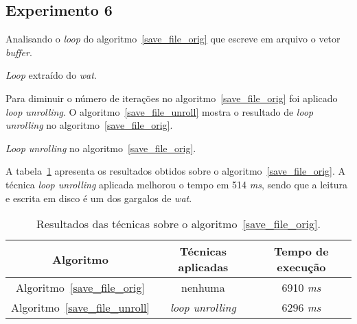 \subsection{Experimento 6}

Analisando o \textit{loop} do algoritmo~\ref{save_file_orig} que escreve em arquivo o 
vetor \textit{buffer}.

\begin{algorithm}[H]
  \caption{\textit{Loop} extraído do \textit{wat}.}
\label{save_file_orig}

\end{algorithm}

Para diminuir o número de iterações no algoritmo~\ref{save_file_orig} foi
aplicado \textit{loop unrolling}. O algoritmo~\ref{save_file_unroll} mostra o
resultado de \textit{loop unrolling} no algoritmo~\ref{save_file_orig}.

\begin{algorithm}[H]
  \caption{\textit{Loop unrolling} no algoritmo~\ref{save_file_orig}.}
\label{save_file_unroll}

\end{algorithm}

A tabela~\ref{tabela_save_file} apresenta os resultados obtidos sobre o
algoritmo~\ref{save_file_orig}. 
A técnica \textit{loop unrolling} aplicada melhorou o tempo em 514 \textit{ms},
sendo que a leitura e escrita em disco é um dos gargalos de \textit{wat}.

\begin{table}[ht]
  \label{tabela_save_file}
\begin{center}
  \begin{tabular}{|c|c|c|}
    \hline
    \textbf{Algoritmo} & \textbf{Técnicas aplicadas} & \textbf{Tempo de execução}\\
    \hline
    Algoritmo~\ref{save_file_orig} & nenhuma & 6910 \textit{ms} \\
    \hline
    Algoritmo~\ref{save_file_unroll} & \textit{loop unrolling} & 6296 \textit{ms} \\
    \hline
  \end{tabular}
  \caption{Resultados das técnicas sobre o algoritmo~\ref{save_file_orig}.}
\end{center}
\end{table}



%


